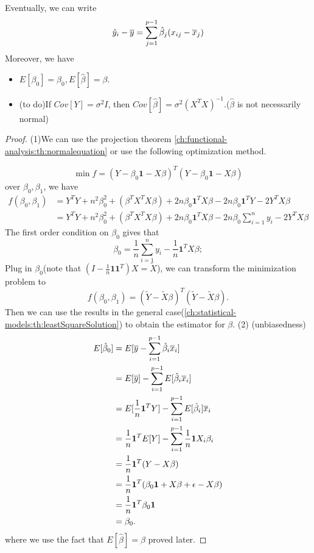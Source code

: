 \begin{refsection}
\begin{theorem}
	Eventually, we can write
	$$\hat{y}_i - \overline{y} =\sum_{j=1}^{p-1} \hat{\beta}_j (x_{ij}-\overline{x}_j) $$
	Moreover, we have
	\begin{itemize}
		\item $E[\beta_0] = \beta_0, E[\hat{\beta}] = \beta$.
		\item (to do)If $Cov[Y] = \sigma^2I$, then $Cov[\hat{\beta}] = \sigma^2(X^TX)^{-1}$.($\hat{\beta}$ is not necessarily normal)
	\end{itemize}
\end{theorem}
\begin{proof}
(1)We can use the projection theorem \autoref{ch:functional-analysis:th:normalequation} or use the following optimization method. 

$$\min f = (Y - \beta_0\bm{1} - X\beta)^T(Y - \beta_0\bm{1} - X\beta)$$
over $\beta_0, \beta_1$, we have
\begin{align*}
f(\beta_0,\beta_1) &= Y^TY + n^2\beta_0^2 + (\beta^TX^TX\beta)+ 2n\beta_0\bm{1}^TX\beta - 2n\beta_0\bm{1}^TY- 2Y^TX\beta \\
&= Y^TY + n^2\beta_0^2 + (\beta^TX^TX\beta)+ 2n\beta_0\bm{1}^TX\beta - 2n\beta_0\sum_{i=1}^n y_i - 2Y^TX\beta 
\end{align*} 
The first order condition on $\beta_0$ gives that
$$\beta_0 = \frac{1}{n}\sum_{i=1}^n y_i - \frac{1}{n} \bm{1}^TX\beta;$$
Plug in $\beta_0$(note that $(I - \frac{1}{n}\bm{1}\bm{1}^T)X = \tilde{X}$), we can transform the minimization problem to
$$f(\beta_0,\beta_1) = (\tilde{Y} - \tilde{X}\beta)^T(\tilde{Y} - \tilde{X}\beta).$$
Then we can use the results in the general case(\autoref{ch:statistical-models:th:leastSquareSolution}) to obtain the estimator for $\beta$.
	(2) (unbiasedness) 
	\begin{align*}
	E[\hat{\beta}_0] &= E[ \overline{y} - \sum_{i=1}^{p-1} \hat{\beta}_i \overline{x}_i] \\
	&= E[ \overline{y}] - \sum_{i=1}^{p-1} E[\hat{\beta}_i \overline{x}_i] \\
	&= E[\frac{1}{n}\bm{1}^TY] - \sum_{i=1}^{p-1} E[\hat{\beta}_i ]\overline{x}_i \\
	&= \frac{1}{n}\bm{1}^TE[Y] - \sum_{i=1}^{p-1} \frac{1}{n}\bm{1}X_i\beta_i\\
	&=\frac{1}{n}\bm{1}^T(Y - X\beta)\\
	&=\frac{1}{n}\bm{1}^T(\beta_0\bm{1} + X\beta + \epsilon - X\beta)\\
	& = \frac{1}{n}\bm{1}^T\beta_0\bm{1} \\
	&=\beta_0.
	\end{align*}
where we use the fact that $E[\hat{\beta}] = \beta$ proved later.
	

\end{proof}
\end{refsection}
